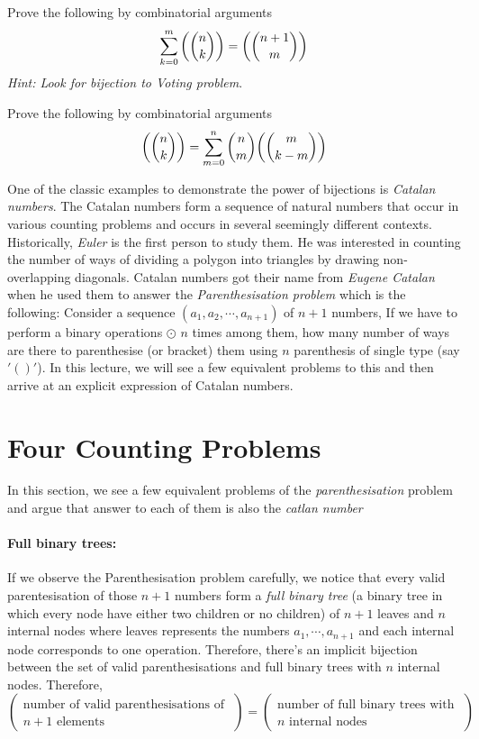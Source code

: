 \begin{exercise}
Prove the following by combinatorial arguments $$\sum\limits_{k=0}^{m}\textrm{$\left(\binom{n}{k}\right)$}=\textrm{$\left(\binom{n+1}{m}\right)$}$$ \emph{Hint: Look for bijection to Voting problem}.
\end{exercise}
\begin{exercise}
Prove the following by combinatorial arguments $$\textrm{$\left(\binom{n}{k}\right)$}=\sum\limits_{m=0}^{n}\binom{n}{m}\textrm{$\left(\binom{m}{k-m}\right)$}$$
\end{exercise}


One of the classic examples to demonstrate the power of bijections is \emph{Catalan numbers}. The Catalan numbers form a sequence of natural numbers that occur in various counting problems and occurs in several seemingly different contexts. Historically, \emph{Euler} is the first person to study them. He was interested in counting the number of ways of dividing a polygon into triangles by drawing non-overlapping diagonals. Catalan numbers got their name from \emph{Eugene Catalan} when he used them to answer the \emph{Parenthesisation problem} which is the following: Consider a sequence $(a_1,a_2,\cdots,a_{n+1})$ of $n+1$ numbers, If we have to perform a binary operations $\odot$ $n$ times among them, how many number of ways are there to parenthesise (or bracket) them using $n$ parenthesis of single type (say $'()'$). In this lecture, we will see a few equivalent problems to this and then arrive at an explicit expression of Catalan numbers.

\section{Four Counting Problems}
In this section, we see a few equivalent problems of the \emph{parenthesisation} problem and argue that answer to each of them is also the \emph{catlan number}
\paragraph{Full binary trees:} If we observe the Parenthesisation problem carefully, we notice that every valid parentesisation of those $n+1$ numbers form a \emph{full binary tree} (a binary tree in which every node have either two children or no children) of $n+1$ leaves and $n$ internal nodes where leaves represents the numbers $a_1,\cdots,a_{n+1}$ and each internal node corresponds to one operation. Therefore, there's an implicit bijection between the set of valid parenthesisations and full binary trees with $n$ internal nodes. Therefore, 
\begin{equation}
\left( \substack{\textrm{number of valid parenthesisations of }\\ n+1 \textrm{ elements }} \right)  = \left( \substack{\textrm{number of full binary trees with }\\ n \textrm{ internal nodes}} \right)
\end{equation}  

